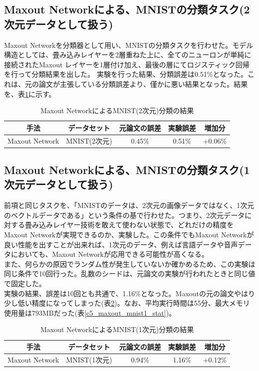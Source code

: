 \subsection{Maxout Networkによる、MNISTの分類タスク(2次元データとして扱う)}
Maxout Networkを分類器として用い、MNISTの分類タスクを行わせた。モデル構造としては、畳み込みレイヤーを2層重ねた上に、全てのニューロンが単純に接続されたMaxout レイヤーを1層付け加え、最後の層にてロジスティック回帰を行って分類結果を出した。
実験を行った結果、分類誤差は0.51\%となった。これは、元の論文が主張している分類誤差より、僅かに悪い結果となった。結果を、表\ref{c5_maxout_mnist2_result}に示す。
\begin{table}[tdp]
\caption{Maxout NetworkによるMNIST(2次元)分類の結果}
\begin{center}
\begin{tabular}{|c|c|c|c|c|}\hline
手法 & データセット & 元論文の誤差 & 実験誤差 & 増加分\\ \hline
Maxout Network & MNIST(2次元) & 0.45\% & 0.51\% & +0.06\% \\ \hline
\end{tabular}
\end{center}
\label{c5_maxout_mnist2_result}
\end{table}%

\subsection{Maxout Networkによる、MNISTの分類タスク(1次元データとして扱う)}
前項と同じタスクを、「MNISTのデータは、2次元の画像データではなく、1次元のベクトルデータである」という条件の基で行わせた。つまり、2次元データに対する畳み込みレイヤー技術を敢えて使わない状態で、どれだけの精度をMaxout Networkが実現できるのか、実験した。この条件でもMaxout Networkが良い性能を出すことが出来れば、1次元のデータ、例えば言語データや音声データにおいても、Maxout Networkが応用できる可能性が高くなる。\\
また、何らかの原因でランダム性が発生していないか確かめるため、この実験は同じ条件で10回行った。乱数のシードは、元論文の実験が行われたときと同じ値で固定した。\\
実験の結果、誤差は10回とも共通で、1.16\%となった。Maxoutの元の論文やはり少し低い精度になってしまった(表\ref{c5_maxout_mnist1_result})。なお、平均実行時間は55分、最大メモリ使用量は793MBだった(表\ref{c5_maxout_mnist1_stat})。\\
\begin{table}[tdp]
\caption{Maxout NetworkによるMNIST(1次元)分類の結果}
\begin{center}
\begin{tabular}{|c|c|c|c|c|}\hline
手法 & データセット & 元論文の誤差 & 実験誤差 & 増加分\\ \hline
Maxout Network & MNIST(1次元) & 0.94\% & 1.16\% & +0.12\% \\ \hline
\end{tabular}
\end{center}
\label{c5_maxout_mnist1_result}
\end{table}%

